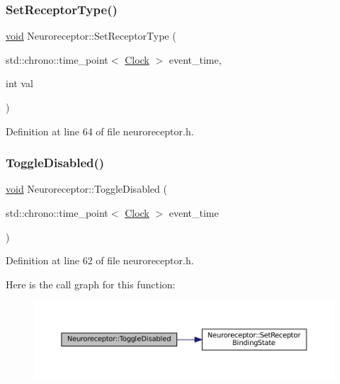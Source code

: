 \subsubsection{\texorpdfstring{Set\+Receptor\+Type()}{SetReceptorType()}}
{\footnotesize\ttfamily \mbox{\hyperlink{glad_8h_a950fc91edb4504f62f1c577bf4727c29}{void}} Neuroreceptor\+::\+Set\+Receptor\+Type (\begin{DoxyParamCaption}\item[{std\+::chrono\+::time\+\_\+point$<$ \mbox{\hyperlink{universe_8h_a0ef8d951d1ca5ab3cfaf7ab4c7a6fd80}{Clock}} $>$}]{event\+\_\+time,  }\item[{int}]{val }\end{DoxyParamCaption})\hspace{0.3cm}{\ttfamily [inline]}}



Definition at line 64 of file neuroreceptor.\+h.

\mbox{\label{class_neuroreceptor_a8a339a4d0f150bbdfbc2650155625196}} 
\subsubsection{\texorpdfstring{Toggle\+Disabled()}{ToggleDisabled()}}
{\footnotesize\ttfamily \mbox{\hyperlink{glad_8h_a950fc91edb4504f62f1c577bf4727c29}{void}} Neuroreceptor\+::\+Toggle\+Disabled (\begin{DoxyParamCaption}\item[{std\+::chrono\+::time\+\_\+point$<$ \mbox{\hyperlink{universe_8h_a0ef8d951d1ca5ab3cfaf7ab4c7a6fd80}{Clock}} $>$}]{event\+\_\+time }\end{DoxyParamCaption})\hspace{0.3cm}{\ttfamily [inline]}}



Definition at line 62 of file neuroreceptor.\+h.

Here is the call graph for this function\+:\nopagebreak
\begin{figure}[H]
\begin{center}
\leavevmode
\includegraphics[width=350pt]{class_neuroreceptor_a8a339a4d0f150bbdfbc2650155625196_cgraph}
\end{center}
\end{figure}
\mbox{\label{class_neuroreceptor_ace41227d30a8f50e1a6efadc86573f80}} 
